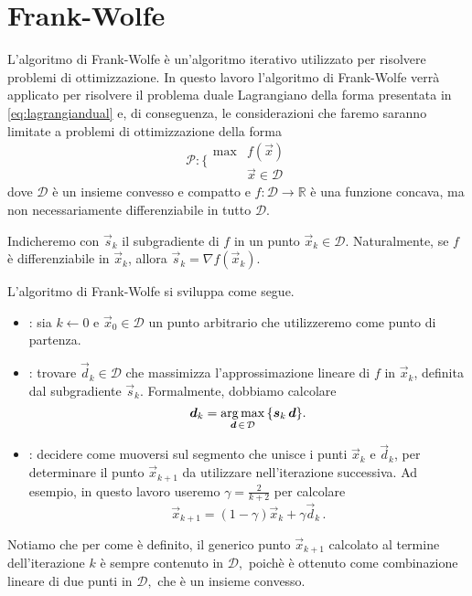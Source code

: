 \section{Frank-Wolfe}\label{sec:fw}
L'algoritmo di Frank-Wolfe è un'algoritmo iterativo utilizzato per risolvere problemi di ottimizzazione. In questo
lavoro l'algoritmo di Frank-Wolfe verrà applicato per risolvere il problema duale Lagrangiano della forma presentata in
\eqref{eq:lagrangiandual} e, di conseguenza, le considerazioni che faremo saranno limitate a problemi di ottimizzazione
della forma
\begin{equation}
    \mathcal{P}\colon \bigg\{
    \begin{array}{ll}
        \max & f(\vec{x}) \\
             & \vec{x} \in \mathcal{D}
    \end{array}
\end{equation}
dove \( \mathcal{D} \) è un insieme convesso e compatto e \( f\colon \mathcal{D} \to \mathbb{R} \) è una funzione
concava, ma non necessariamente differenziabile in tutto \( \mathcal{D} \).

Indicheremo con \( \vec{s}_k \) il subgradiente di \( f \) in un punto \( \vec{x}_k \in \mathcal{D} \). Naturalmente, se
\( f \) è differenziabile in \( \vec{x}_k \), allora \( \vec{s}_k = \nabla f(\vec{x}_k) \).

L'algoritmo di Frank-Wolfe si sviluppa come segue.

\begin{itemize}
    \item {}: sia \( k \gets 0 \) e \( \vec{x}_0 \in \mathcal{D} \) un punto arbitrario che
        utilizzeremo come punto di partenza.

    \item {}: trovare \( \vec{d}_k \in \mathcal{D} \) che massimizza l'approssimazione lineare di \( f
        \) in \( \vec{x}_k \), definita dal subgradiente \( \vec{s}_k \). Formalmente,
        dobbiamo calcolare
        \[
            \bm{d}_k = \operatorname*{arg\,max}_{\bm{d} \,\in\, \mathcal{D}} \, \{\bm{s}_k\, \bm{d}\}.
        \]
    \item {}: decidere come muoversi sul segmento che unisce i punti \(
        \vec{x}_k \) e \( \vec{d}_k \), per determinare il punto \( \vec{x}_{k+1} \) da utilizzare nell'iterazione
        successiva. Ad esempio, in questo lavoro useremo \( \gamma = \frac{2}{k+2} \) per calcolare
        \[
            \vec{x}_{k+1} = (1 - \gamma)\vec{x}_k + \gamma\vec{d}_k\,.
        \]
\end{itemize}
Notiamo che per come è definito, il generico punto \( \vec{x}_{k+1} \) calcolato al termine dell'iterazione \( k \) è
sempre contenuto in
\(
    \mathcal{D},
\)
poichè è ottenuto come combinazione lineare di due punti in
\(
    \mathcal{D},
\)
che è un insieme convesso.

